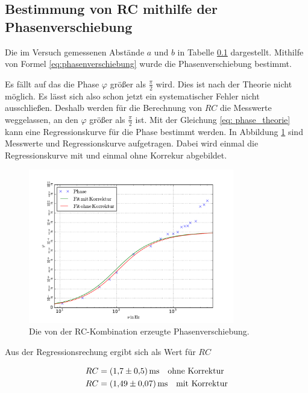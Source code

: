 \subsection{Bestimmung von RC mithilfe der Phasenverschiebung}
Die im Versuch gemessenen Abstände $a$ und $b$ in Tabelle \ref{}
dargestellt. Mithilfe von Formel \eqref{eq:phasenverschiebung} wurde die
Phasenverschiebung bestimmt.

Es fällt auf das die Phase $\varphi$ größer als $\frac{\pi}{2}$ wird.
Dies ist nach der Theorie nicht möglich.
Es lässt sich also schon jetzt ein systematischer Fehler nicht ausschließen.
Deshalb werden für die Berechnung von $RC$ die Messwerte weggelassen, an den
$\varphi$ größer als $\frac{\pi}{2}$ ist.
Mit der Gleichung \eqref{eq: phase_theorie} kann eine Regressionskurve für die
Phase bestimmt werden.
In Abbildung \ref{fig:plot_teil_c} sind Messwerte und Regressionskurve aufgetragen.
Dabei wird einmal die Regressionskurve mit und einmal ohne Korrekur abgebildet.
\begin{figure}
  \includegraphics[width=0.8\textwidth]{pics/frequenz_phase.pdf}
  \caption{Die von der RC-Kombination erzeugte Phasenverschiebung.}
  \label{fig:plot_teil_c}
\end{figure}
Aus der Regressionsrechung ergibt sich als Wert für $RC$

\begin{align}
  \label{eq:teil_c_rc}
  \begin{aligned}
    RC&=\SI{1.7\pm0.5}{\milli\second} \quad \text{ohne Korrektur} \\
    RC& =\SI{1.49\pm0.07}{\milli\second} \quad \text{mit Korrektur}
\end{aligned}
\end{align}
